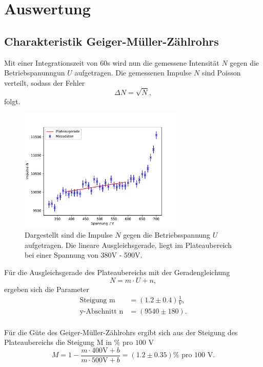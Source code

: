 \newpage
\section{Auswertung}
\subsection{Charakteristik Geiger-Müller-Zählrohrs}
Mit einer Integrationszeit von $60$s wird nun die gemessene Intensität
$N$ gegen die Betriebspanunngun $U$ aufgetragen.
Die gemessenen Impulse $N$ sind Poisson verteilt, sodass der Fehler
\begin{equation*}
    \Delta N = \sqrt{N},
\end{equation*}
folgt.
\begin{figure}
    \centering
    \includegraphics[width=0.7\textwidth]{input/p_charakteristik.pdf}
    \caption{Dargestellt sind die Impulse $N$ gegen die Betriebsspannung $U$ aufgetragen.
    Die lineare Ausgleichsgerade, liegt im Plateaubereich bei einer Spannung von
    380V - 590V.}
\end{figure}
\label{sec:Auswertung}
Für die Ausgleichsgerade des Plateaubereichs mit der Geradengleichung
\begin{equation}
    N=m\cdot U+n,
\end{equation}
ergeben sich die Parameter
\begin{align*}
    \text{Steigung m} &= (1.2\pm0.4)\frac{1}{\si{V}},\\
    \text{y-Abschnitt n}&= (9540\pm180).\\
\end{align*}

Für die Güte des Geiger-Müller-Zählrohrs ergibt sich aus der Steigung des
Plateaubereichs die Steigung M in \% pro $100$ V
\begin{equation*}
    M=1-\frac{m\cdot 400\text{V}+b}{m\cdot 500\text{V}+b}=(1.2\pm 0.35)\% \text{ pro } 100 \text{ V}.
\end{equation*}

